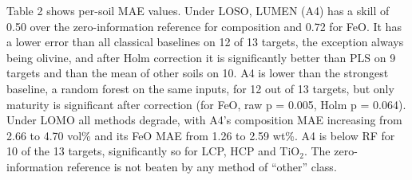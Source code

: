 \documentclass[remotesensing,article,submit,pdftex,moreauthors]{Definitions/mdpi}
\begin{document}
Table 2 shows per-soil MAE values. Under LOSO, LUMEN (A4) has a skill of 0.50 over the zero-information reference for composition and 0.72 for FeO. It has a lower error than all classical baselines on 12 of 13 targets, the exception always being olivine, and after Holm correction it is significantly better than PLS on 9 targets and than the mean of other soils on 10. A4 is lower than the strongest baseline, a random forest on the same inputs, for 12 out of 13 targets, but only maturity is significant after correction (for FeO, raw p = 0.005, Holm p = 0.064). Under LOMO all methods degrade, with A4's composition MAE increasing from 2.66 to 4.70 vol\% and its FeO MAE from 1.26 to 2.59 wt\%. A4 is below RF for 10 of the 13 targets, significantly so for LCP, HCP and TiO$_{2}$. The zero-information reference is not beaten by any method of ``other'' class.
\end{document}
